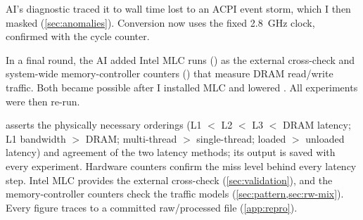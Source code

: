 \begin{description}[style=nextline]
\begin{enumerate}[(1),nosep,leftmargin=*]
                AI's diagnostic traced it to wall time lost to an ACPI event storm, which I then masked
                (\cref{sec:anomalies}). Conversion now uses the fixed \qty{2.8}{\giga\hertz} clock,
                confirmed with the cycle counter.
        \end{enumerate}
        In a final round, the AI added Intel MLC runs () as the external cross-check and
        system-wide memory-controller counters () that measure DRAM read/write traffic.
        Both became possible after I installed MLC and lowered . All
        experiments were then re-run.
  \item[Validation]  asserts the physically necessary orderings (L1 $<$ L2
        $<$ L3 $<$ DRAM latency; L1 bandwidth $>$ DRAM; multi-thread $>$ single-thread; loaded $>$
        unloaded latency) and agreement of the two latency methods; its output is saved with every
        experiment. Hardware counters confirm the miss level behind every latency step. Intel MLC provides
        the external cross-check (\cref{sec:validation}), and the memory-controller counters check the
        traffic models (\cref{sec:pattern,sec:rw-mix}). Every figure traces to a committed raw/processed file
        (\cref{app:repro}).
\end{description}

